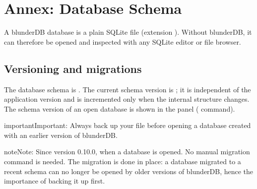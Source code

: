 \documentclass[letterpaper,10pt,english]{sphinxmanual}
\begin{document}
\sphinxstepscope


\section{Annex: Database Schema}
\label{\detokenize{annexe_db_scheme:annexe-schema-de-la-base-de-donnees}}\label{\detokenize{annexe_db_scheme:annexe-db-migration}}\label{\detokenize{annexe_db_scheme::doc}}
\sphinxAtStartPar
A blunderDB database is a plain SQLite file (extension ). Without blunderDB, it can therefore be opened and inspected with any SQLite editor or file browser.


\subsection{Versioning and migrations}
\label{\detokenize{annexe_db_scheme:versionnage-et-migrations}}
\sphinxAtStartPar
The database schema is . The current schema version is ; it is independent of the application version and is incremented only when the internal structure changes. The schema version of an open database is shown in the  panel ( command).

\begin{sphinxadmonition}{important}{Important:}
\sphinxAtStartPar
Always back up your  file before opening a database created with an earlier version of blunderDB.
\end{sphinxadmonition}

\begin{sphinxadmonition}{note}{Note:}
\sphinxAtStartPar
Since version 0.10.0,  when a database is opened. No manual migration command is needed. The migration is done in place: a database migrated to a recent schema can no longer be opened by older versions of blunderDB, hence the importance of backing it up first.
\end{sphinxadmonition}
\end{document}
